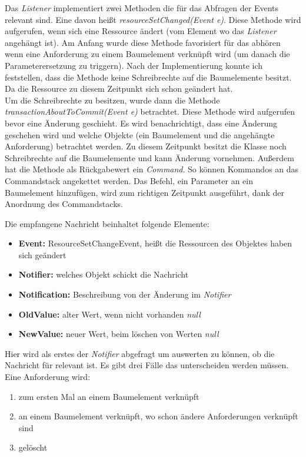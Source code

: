 Das \textit{Listener} implementiert zwei Methoden die für das Abfragen der Events relevant sind. Eine davon heißt \textit{resourceSetChanged(Event e)}. Diese Methode wird aufgerufen, wenn sich eine Ressource ändert (vom Element wo das \textit{Listener} angehängt ist). Am Anfang wurde diese Methode favorisiert für das abhören wenn eine Anforderung zu einem Baumelement verknüpft wird (um danach die Parameterersetzung zu triggern). Nach der Implementierung konnte ich feststellen, dass die Methode keine Schreibrechte auf die Baumelemente besitzt. Da die Ressource zu diesem Zeitpunkt sich schon geändert hat.\\

Um die Schreibrechte zu besitzen, wurde dann die Methode \textit{transactionAboutToCommit(Event e)} betrachtet. Diese Methode wird aufgerufen bevor eine Änderung geschieht. Es wird benachrichtigt, dass eine Änderung geschehen wird und welche Objekte (ein Baumelement und die angehängte Anforderung) betrachtet werden. Zu diesem Zeitpunkt besitzt die Klasse noch Schreibrechte auf die Baumelemente und kann Änderung vornehmen. Außerdem hat die Methode als Rückgabewert ein \textit{Command}. So können Kommandos an das Commandstack angekettet werden. Das Befehl, ein Parameter an ein Baumelement hinzufügen, wird zum richtigen Zeitpunkt ausgeführt, dank der Anordnung des Commandstacks. 


Die empfangene Nachricht beinhaltet folgende Elemente: 

\begin{itemize}
\item \textbf{Event: }ResourceSetChangeEvent, heißt die Ressourcen des Objektes haben sich geändert
\item \textbf{Notifier: } welches Objekt schickt die Nachricht
\item \textbf{Notification: }Beschreibung von der Änderung im \textit{Notifier}
\item \textbf{OldValue: } alter Wert, wenn nicht vorhanden \textit{null}
\item \textbf{NewValue: } neuer Wert, beim löschen von Werten \textit{null}
\end{itemize}


Hier wird als erstes der \textit{Notifier} abgefragt um auswerten zu können, ob die Nachricht für relevant ist. Es gibt drei Fälle das unterscheiden werden müssen. Eine Anforderung wird:


\begin{enumerate}
\item zum ersten Mal an einem Baumelement verknüpft
\item an einem Baumelement verknüpft, wo schon ändere Anforderungen verknüpft sind
\item gelöscht
\end{enumerate}


